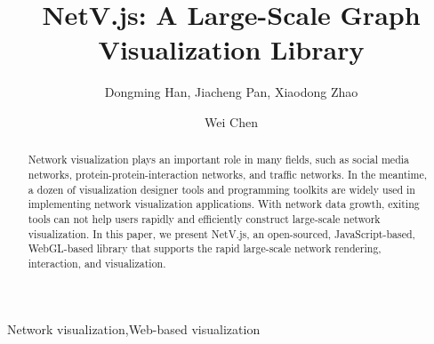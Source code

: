 \documentclass[5p]{elsarticle}
\newcommand{\name}{NetV.js\xspace}
\begin{document}
\begin{CJK}{UTF8}{gbsn}
\begin{frontmatter}

\title{\name: A Large-Scale Graph Visualization Library}

\author[mymainaddress,mysecondaryaddress]{Dongming Han, Jiacheng Pan, Xiaodong Zhao}
\author[mymainaddress]{Wei Chen}

\address[mymainaddress]{State Key Lab of CAD\&CG, Zhejiang University, Hangzhou, Zhejiang, China}
\address[mysecondaryaddress]{Zhejiang Lab, hangzhou, zhejiang, China}

\begin{abstract}
    Network visualization plays an important role in many fields, such as social media networks, protein-protein-interaction networks, and traffic networks. In the meantime, a dozen of visualization designer tools and programming toolkits are widely used in implementing network visualization applications. With network data growth, exiting tools can not help users rapidly and efficiently construct large-scale network visualization.
    In this paper, we present \name, an open-sourced, JavaScript-based, WebGL-based library that supports the rapid large-scale network rendering, interaction, and visualization.
    
\end{abstract}

\begin{keyword}
Network visualization\sep Web-based visualization
\end{keyword}

\end{frontmatter}

\linenumbers










\end{CJK}
\end{document}

